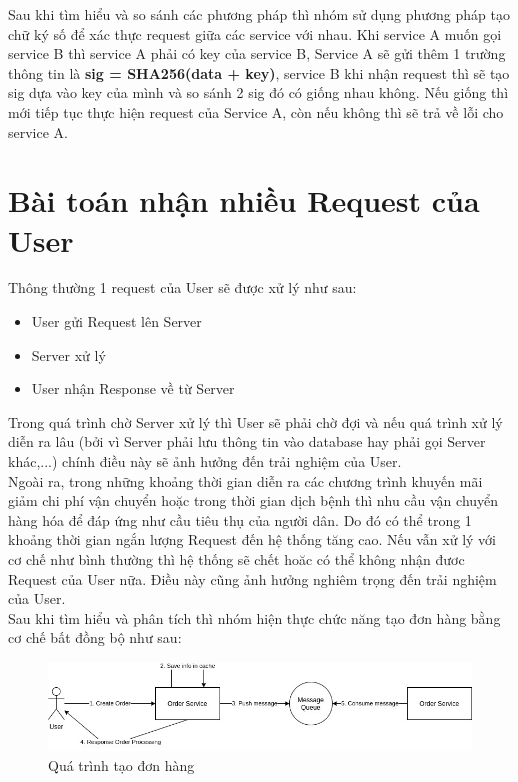 		Sau khi tìm hiểu và so sánh các phương pháp thì nhóm sử dụng phương pháp tạo chữ ký số để xác thực request giữa các service với nhau. Khi service A muốn gọi service B thì service A phải có key của service B, Service A sẽ gửi thêm 1 trường thông tin là \textbf{sig = SHA256(data + key)}, service B khi nhận request thì sẽ tạo sig dựa vào key của mình và so sánh 2 sig đó có giống nhau không. Nếu giống thì mới tiếp tục thực hiện request của Service A, còn nếu không thì sẽ trả về lỗi cho service A.
		
		
		\section{Bài toán nhận nhiều Request của User}
		Thông thường 1 request của User sẽ được xử lý như sau: 
		    \begin{itemize}
                \item User gửi Request lên Server
                \item Server xử lý
                \item User nhận Response về từ Server 
            \end{itemize}
        Trong quá trình chờ Server xử lý thì User sẽ phải chờ đợi và nếu quá trình xử lý diễn ra lâu (bởi vì Server phải lưu thông tin vào database hay phải gọi Server khác,...) chính điều này sẽ ảnh hưởng đến trải nghiệm của User.\\
        Ngoài ra, trong những khoảng thời gian diễn ra các chương trình khuyến mãi giảm chi phí vận chuyển hoặc trong thời gian dịch bệnh thì nhu cầu vận chuyển hàng hóa để đáp ứng như cầu tiêu thụ của người dân. Do đó có thể trong 1 khoảng thời gian ngắn lượng Request đến hệ thống tăng cao. Nếu vẫn xử lý với cơ chế như bình thường thì hệ thống sẽ chết hoăc có thể không nhận đươc Request của User nữa. Điều này cũng ảnh hưởng nghiêm trọng đến trải nghiệm của User.\\
        Sau khi tìm hiểu và phân tích thì nhóm hiện thực chức năng tạo đơn hàng bằng cơ chế bất đồng bộ như sau:\\
        
        \begin{figure}[!ht]
			\includegraphics[width=1\textwidth]{Images/problem1.jpg}
			\centering
			\linebreak
			\caption{Quá trình tạo đơn hàng}
		\end{figure}
        
